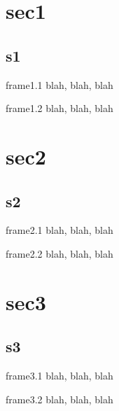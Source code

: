 \documentclass{beamer}
\begin{document}
   \section{sec1}
   \subsection{s1}
   \begin{frame}{frame1.1}
    blah, blah, blah
   \end{frame}
   \begin{frame}{frame1.2}
    blah, blah, blah
   \end{frame}

   \section{sec2}
   \subsection{s2}
   \begin{frame}{frame2.1}
    blah, blah, blah
   \end{frame}
   \begin{frame}{frame2.2}
    blah, blah, blah
   \end{frame}

   \section{sec3}
   \subsection{s3}
   \begin{frame}{frame3.1}
    blah, blah, blah
   \end{frame}
   \begin{frame}{frame3.2}
    blah, blah, blah
   \end{frame}
\end{document}
